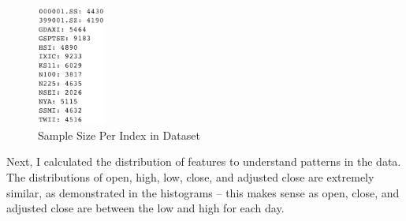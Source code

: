 \documentclass[a4paper, 11pt]{article}
\begin{document}
\begin{figure}[H]
    \begin{center}
        \includegraphics[width=0.2\textwidth]{Sample Size Per Index.png}
        \caption{Sample Size Per Index in Dataset}
    \end{center}
\end{figure}

Next, I calculated the distribution of features to understand patterns in the data. The distributions of open, high, low, close, and adjusted close are extremely similar, as demonstrated in the histograms -- this makes sense as open, close, and adjusted close are between the low and high for each day.
\end{document}

